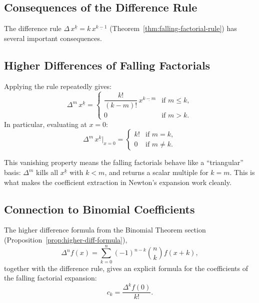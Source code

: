 
\subsection*{Consequences of the Difference Rule}

\begin{exposition}
The difference rule \(\Delta\,x^{\underline{k}} = k\,x^{\underline{k-1}}\)
(Theorem~\ref{thm:falling-factorial-rule}) has several important consequences.
\end{exposition}

\subsection*{Higher Differences of Falling Factorials}

\begin{exposition}
Applying the rule repeatedly gives:
\[
\Delta^m\, x^{\underline{k}}
=
\begin{cases}
\dfrac{k!}{(k-m)!}\, x^{\underline{k-m}} & \text{if } m \le k, \\[6pt]
0 & \text{if } m > k.
\end{cases}
\]
In particular, evaluating at \(x = 0\):
\[
\Delta^m\, x^{\underline{k}}\big|_{x=0}
=
\begin{cases}
k! & \text{if } m = k, \\
0 & \text{if } m \ne k.
\end{cases}
\]
\end{exposition}

\begin{remark*}[Interpretation]
This vanishing property means the falling factorials behave like a
``triangular'' basis: \(\Delta^m\) kills all \(x^{\underline{k}}\) with
\(k < m\), and returns a scalar multiple for \(k = m\). This is what
makes the coefficient extraction in Newton's expansion work cleanly.
\end{remark*}

\subsection*{Connection to Binomial Coefficients}

\begin{exposition}
The higher difference formula from the Binomial Theorem section
(Proposition~\ref{prop:higher-diff-formula}),
\[
\Delta^n f(x) = \sum_{k=0}^{n}(-1)^{n-k}\binom{n}{k}f(x+k),
\]
together with the difference rule, gives an explicit formula for the
coefficients of the falling factorial expansion:
\[
c_k = \frac{\Delta^k f(0)}{k!}.
\]
\end{exposition}


